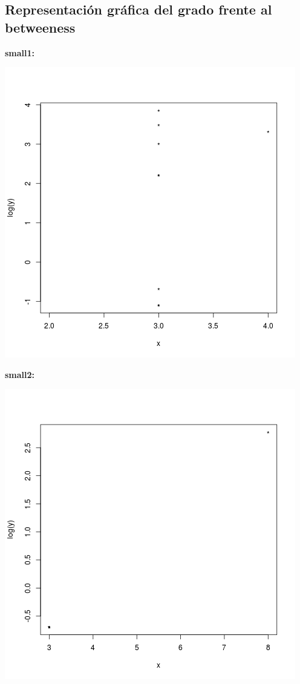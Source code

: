 \documentclass[palatino,nochap]{apuntes}
\begin{document}
\subsection{Representación gráfica del grado frente al betweeness }

\textbf{small1:}

\begin{center}
	\includegraphics[scale=0.45]{img/small1_grado-betweeness}
\end{center}


\textbf{small2:}

\begin{center}
	\includegraphics[scale=0.45]{img/small2_grado-betweeness}
\end{center}
\end{document}
